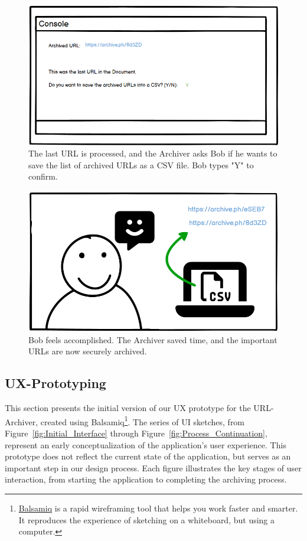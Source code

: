 \begin{figure}[h!]
    \centering
    \includegraphics[width=1\textwidth]{pictures/Story Board/StoryBoard_7}
    \caption{The last URL is processed, and the Archiver asks Bob if he wants to save the list of archived URLs as a CSV file. Bob types "Y" to confirm.}
    \label{fig:StoryBoard_7}
\end{figure}
\begin{figure}[h!]
    \centering
    \includegraphics[width=1\textwidth]{pictures/Story Board/StoryBoard_8}
    \caption{Bob feels accomplished. The Archiver saved time, and the important URLs are now securely archived.}
    \label{fig:StoryBoard_8}
\end{figure}
\clearpage

\subsection{UX-Prototyping}
This section presents the initial version of our UX prototype for the URL-Archiver, created using Balsamiq\footnote{\href{https://balsamiq.com/}{Balsamiq} is a rapid wireframing tool that helps you work faster and smarter. It reproduces the experience of sketching on a whiteboard, but using a computer.}.
The series of UI sketches, from Figure~\ref{fig:Initial_Interface} through Figure~\ref{fig:Process_Continuation}, represent an early conceptualization of the application's user experience.
This prototype does not reflect the current state of the application, but serves as an important step in our design process.
Each figure illustrates the key stages of user interaction, from starting the application to completing the archiving process.

